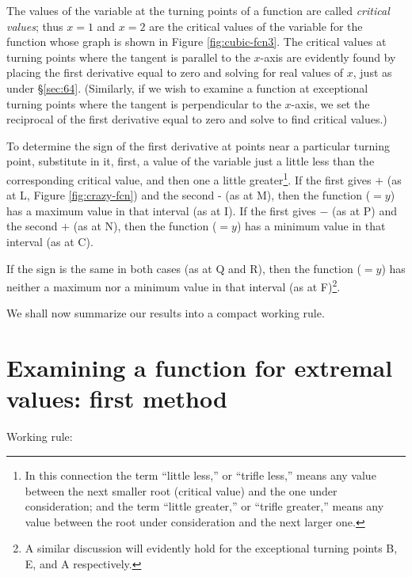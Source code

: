 The values of the variable at the turning points of a function 
are called {\it critical values}; thus $x = 1$ and $x = 2$ are the 
critical values of the variable for the function whose 
graph is shown in Figure \ref{fig:cubic-fcn3}. %
The critical values at turning points where the 
tangent is parallel to the $x$-axis are evidently found by 
placing the first derivative equal to zero and solving 
for real values of $x$, just as under \S \ref{sec:64}. %
(Similarly, if we wish to examine a function at exceptional 
turning points where the tangent is perpendicular to the $x$-axis, 
we set the reciprocal of the first derivative equal to 
zero and solve to find critical values.)

To determine the sign of the first derivative at points near 
a particular turning point, substitute in it, first, a value 
of the variable just a little less than the corresponding critical 
value, and then one a little greater\footnote{In this connection the 
term ``little less,'' or ``trifle less,'' means any value between 
the next smaller root (critical value) and the one under 
consideration; and the term ``little greater,'' or ``trifle greater,''
means any value between the root under consideration and the next larger one.}. 
If the first gives $+$ (as at L, Figure \ref{fig:crazy-fcn}) 
and the second - (as at M), then the function ($= y$) has a maximum value 
in that interval (as at I).
If the first gives $-$ (as at P) and the second $+$ (as at N), then 
the function ($= y$) has a minimum value in that interval (as at C).

If the sign is the same in both cases (as at Q and R), 
then the function ($= y$) has neither a maximum nor a minimum 
value in that interval (as at F)\footnote{A similar discussion 
will evidently hold for the exceptional turning points B, E, and A 
respectively.}.

We shall now summarize our results into a compact working rule.


\section{Examining a function for extremal values: first method}

Working rule:

